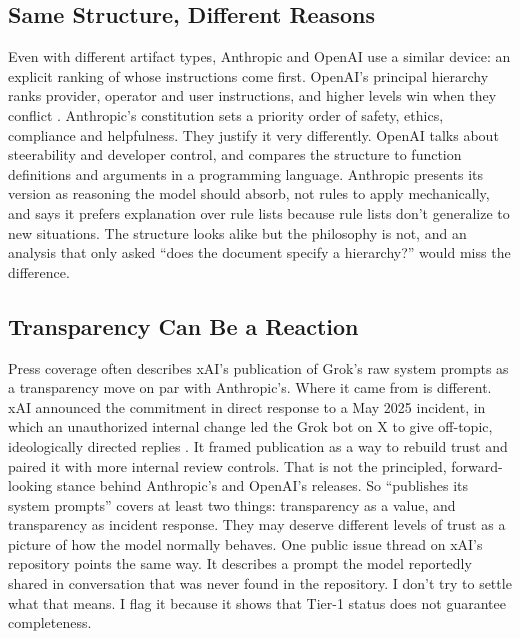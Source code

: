 \documentclass[11pt]{article}
\begin{document}
\subsection{Same Structure, Different Reasons}
Even with different artifact types, Anthropic and OpenAI use a similar
device: an explicit ranking of whose instructions come first. OpenAI's
principal hierarchy ranks provider, operator and user instructions, and
higher levels win when they conflict \citep{openai2025modelspec}. Anthropic's
constitution sets a priority order of safety, ethics, compliance and
helpfulness. They justify it very differently. OpenAI talks about
steerability and developer control, and compares the structure to function
definitions and arguments in a programming language. Anthropic presents its
version as reasoning the model should absorb, not rules to apply
mechanically, and says it prefers explanation over rule lists because rule
lists don't generalize to new situations. The structure looks alike but the
philosophy is not, and an analysis that only asked ``does the document
specify a hierarchy?'' would miss the difference.

\subsection{Transparency Can Be a Reaction}
Press coverage often describes xAI's publication of Grok's raw system prompts
as a transparency move on par with Anthropic's. Where it came from is
different. xAI announced the commitment in direct response to a May 2025
incident, in which an unauthorized internal change led the Grok bot on X to
give off-topic, ideologically directed replies \citep{xaiincident2025}. It
framed publication as a way to rebuild trust and paired it with more internal
review controls. That is not the principled, forward-looking stance behind
Anthropic's and OpenAI's releases. So ``publishes its system prompts'' covers
at least two things: transparency as a value, and transparency as incident
response. They may deserve different levels of trust as a picture of how the
model normally behaves. One public issue thread on xAI's repository points the
same way. It describes a prompt the model reportedly shared in conversation
that was never found in the repository. I don't try to settle what that
means. I flag it because it shows that Tier-1 status does not guarantee
completeness.
\end{document}

